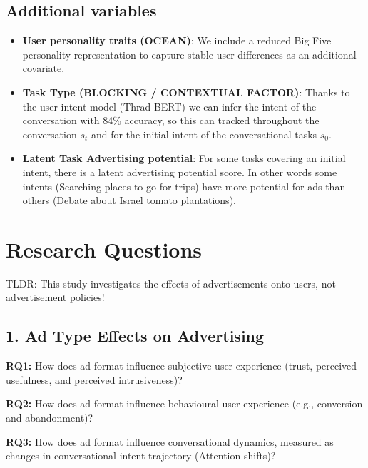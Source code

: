 \documentclass{article}
\begin{document}
\subsection{Additional variables}

\begin{itemize}
    \item \textbf{User personality traits (OCEAN)}:     We include a reduced Big Five personality representation to capture stable user differences as an additional covariate.
\end{itemize}

\begin{itemize}
    \item \textbf{Task Type (BLOCKING / CONTEXTUAL FACTOR)}: Thanks to the user intent model (Thrad BERT) we can infer the intent of the conversation with 84\% accuracy, so this can tracked throughout the conversation $s_t$ and for the initial intent of the conversational tasks $s_0$.

    \item \textbf{Latent Task Advertising potential}: For some tasks covering an initial intent, there is a latent advertising potential score. In other words some intents (Searching places to go for trips) have more potential for ads than others (Debate about Israel tomato plantations).

\end{itemize}
    
\newpage
\section{Research Questions}

TLDR: This study investigates the effects of advertisements onto users, not advertisement policies!

\subsection{1. Ad Type Effects on Advertising}

\textbf{RQ1:} How does ad format influence subjective user experience (trust, perceived usefulness, and perceived intrusiveness)?

\textbf{RQ2:} How does ad format influence behavioural user experience (e.g., conversion and abandonment)?

\textbf{RQ3:} How does ad format influence conversational dynamics, measured as changes in conversational intent trajectory (Attention shifts)?
\end{document}
